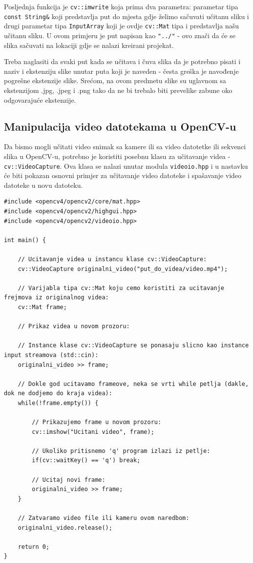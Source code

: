 \documentclass[a4paper, 12pt]{article}
\begin{document}
Posljednja funkcija je \lstinline{cv::imwrite} koja prima dva parametra: parametar tipa \lstinline{const String&} koji predstavlja put do mjesta gdje želimo sačuvati učitanu sliku i drugi parametar tipa \lstinline{InputArray} koji je ovdje \lstinline{cv::Mat} tipa i predstavlja našu učitanu sliku. U ovom primjeru je put napisan kao \lstinline{"../"} - ovo znači da će se slika sačuvati na lokaciji gdje se nalazi kreirani projekat.

Treba naglasiti da svaki put kada se učitava i čuva slika da je potrebno pisati i naziv i ekstenziju slike unutar puta koji je naveden - česta greška je navođenje pogrešne ekstenzije slike. Srećom, na ovom predmetu slike su uglavnom sa ekstenzijom .jpg, .jpeg i .png tako da ne bi trebalo biti prevelike zabune oko odgovarajuće ekstenzije.

\subsection*{Manipulacija video datotekama u OpenCV-u}

Da bismo mogli učitati video snimak sa kamere ili sa video datotetke ili sekvenci slika u OpenCV-u, potrebno je koristiti posebnu klasu za učitavanje videa - \lstinline{cv::VideoCapture}. Ova klasa se nalazi unutar modula \lstinline{videoio.hpp} i u nastavku će biti pokazan osnovni primjer za učitavanje video datoteke i spašavanje video datoteke u novu datoteku.

\begin{lstlisting}
#include <opencv4/opencv2/core/mat.hpp>
#include <opencv4/opencv2/highgui.hpp>
#include <opencv4/opencv2/videoio.hpp>

int main() {

    // Ucitavanje videa u instancu klase cv::VideoCapture:
    cv::VideoCapture originalni_video("put_do_videa/video.mp4");

    // Varijabla tipa cv::Mat koju cemo koristiti za ucitavanje frejmova iz originalnog videa:
    cv::Mat frame;

    // Prikaz videa u novom prozoru:

    // Instance klase cv::VideoCapture se ponasaju slicno kao instance input streamova (std::cin):
    originalni_video >> frame;

    // Dokle god ucitavamo frameove, neka se vrti while petlja (dakle, dok ne dodjemo do kraja videa):
    while(!frame.empty()) {

        // Prikazujemo frame u novom prozoru:
        cv::imshow("Ucitani video", frame);

        // Ukoliko pritisnemo 'q' program izlazi iz petlje:
        if(cv::waitKey() == 'q') break;

        // Ucitaj novi frame:
        originalni_video >> frame;
    }

    // Zatvaramo video file ili kameru ovom naredbom:
    originalni_video.release();

    return 0;
}
\end{lstlisting}
\end{document}

